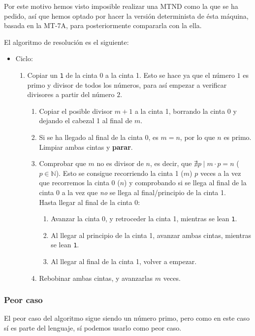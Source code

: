 Por este motivo hemos visto imposible realizar una MTND como la que se ha pedido, así que hemos optado por hacer la versión determinista de ésta máquina, basada en la MT-7A, para posteriormente compararla con la ella.\bigskip

El algoritmo de resolución es el siguiente:
\begin{itemize}
    \item Ciclo:
    \begin{enumerate}
        \item Copiar un \texttt{1} de la cinta 0 a la cinta 1. Esto se hace ya que el número $1$ es primo y divisor de todos los números, para así empezar a verificar divisores a partir del número $2$.
        \begin{enumerate}
            \item Copiar el posible divisor $m+1$ a la cinta 1, borrando la cinta 0 y dejando el cabezal 1 al final de $m$.
            \item Si se ha llegado al final de la cinta 0, es $m=n$, por lo que $n$ es primo. Limpiar ambas cintas y \textbf{parar}.
            \item Comprobar que $m$ no es divisor de $n$, es decir, que $\nexists p \mid m\cdot p = n$ ($p \in \mathbb{N}$). Esto se consigue recorriendo la cinta 1 ($m$) $p$ veces a la vez que recorremos la cinta 0 ($n$) y comprobando si se llega al final de la cinta 0 a la vez que \textit{no} se llega al final/principio de la cinta 1.\\
            Hasta llegar al final de la cinta 0:
            \begin{enumerate}[1.]
                \item Avanzar la cinta 0, y retroceder la cinta 1, mientras se lean \texttt{1}.
                \item Al llegar al principio de la cinta 1, avanzar ambas cintas, mientras se lean \texttt{1}.
                \item Al llegar al final de la cinta 1, volver a empezar.
            \end{enumerate}
            \item Rebobinar ambas cintas, y avanzarlas $m$ veces.
        \end{enumerate}
    \end{enumerate}
\end{itemize}



\subsubsection*{Peor caso}
El peor caso del algoritmo sigue siendo un número primo, pero como en este caso sí es parte del lenguaje, sí podemos usarlo como peor caso.


